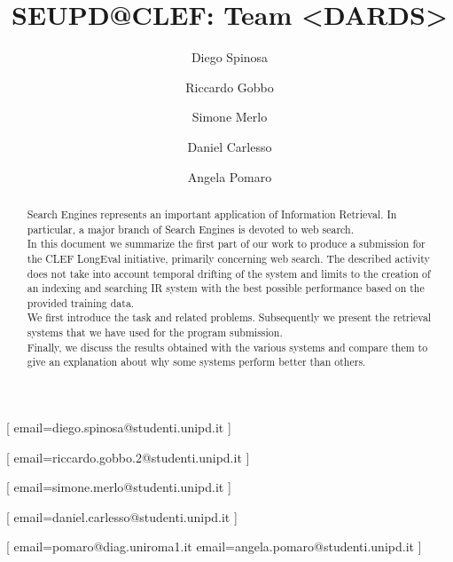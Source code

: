 \documentclass{ceurart}
\begin{document}


\title{SEUPD@CLEF: Team <DARDS>}

\author[1]{Diego Spinosa}[%
email=diego.spinosa@studenti.unipd.it
]

\author[1]{Riccardo Gobbo}[%
email=riccardo.gobbo.2@studenti.unipd.it
]

\author[1]{Simone Merlo}[%
email=simone.merlo@studenti.unipd.it
]

\author[1]{Daniel Carlesso}[%
email=daniel.carlesso@studenti.unipd.it
]

\author[1,2]{Angela Pomaro}[%
email=pomaro@diag.uniroma1.it
email=angela.pomaro@studenti.unipd.it
]

\address[1]{University of Padua, Italy}
\address[2]{University of Rome La Sapienza, Italy}


\begin{abstract}
  Search Engines represents an important application of Information Retrieval. In particular, a major branch of Search Engines is devoted to web search.
  \\
  In this document we summarize the first part of our work to produce a submission for the CLEF LongEval initiative, primarily concerning web search. The described activity does not take into account temporal drifting of the system and limits to the creation of an indexing and searching IR system with the best possible performance based on the provided training data.
  \\
  We first introduce the task and related problems. Subsequently we present the retrieval systems that we have used for the program submission.
  \\
  Finally, we discuss the results obtained with the various systems and compare them to give an explanation about why some systems perform better than others.
\end{abstract}
\end{document}

